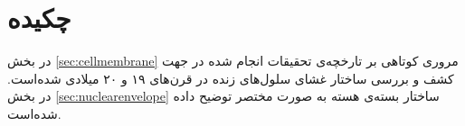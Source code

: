 \setRL
\clearpage
\def \MemFluc {\Mempath /MembraneFluc}

\section{
چکیده
}
در بخش
\ref{sec:cellmembrane}
مروری کوتاهی بر تارخچه‌ی تحقیقات انجام شده در جهت کشف و بررسی ساختار غشای سلول‌های زنده در قرن‌های ۱۹ و ۲۰ میلادی شده‌است. در بخش
\ref{sec:nuclearenvelope}
ساختار بسته‌ی هسته به صورت مختصر توضیح داده شده‌است.









